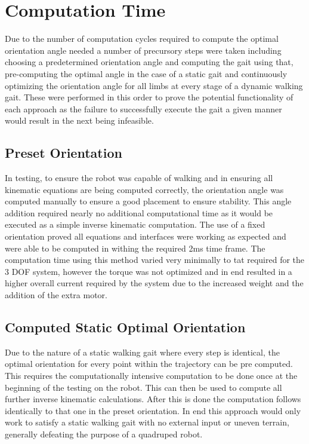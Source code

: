 \documentclass[12pt]{report}
\begin{document}
\section{Computation Time}\label{sec:CompTime}
Due to the number of computation cycles required to compute the optimal orientation angle needed a number of precursory steps were taken including choosing a predetermined orientation angle and computing the gait using that, pre-computing the optimal angle in the case of a static gait and continuously optimizing the orientation angle for all limbs at every stage of a dynamic walking gait. These were performed in this order to prove the potential functionality of each approach as the failure to successfully execute the gait a given manner would result in the next being infeasible.

\subsection{Preset Orientation}

In testing, to ensure the robot was capable of walking and in ensuring all kinematic equations are being computed correctly, the orientation angle was computed manually to ensure a good placement to ensure stability. This angle addition required nearly no additional computational time as it would be executed as a simple inverse kinematic computation. The use of a fixed orientation proved all equations and interfaces were working as expected and were able to be computed in withing the required 2ms time frame. The computation time using this method varied very minimally to tat required for the 3 DOF system, however the torque was not optimized and in end resulted in a higher overall current required by the system due to the increased weight and the addition of the extra motor.

\subsection{Computed Static Optimal Orientation}
Due to the nature of a static walking gait where every step is identical, the optimal orientation for every point within the trajectory can be pre computed. This requires the computationally intensive computation to be done once at the beginning of the testing on the robot. This can then be used to compute all further inverse kinematic calculations. After this is done the computation follows identically to that one in the preset orientation. In end this approach would only work to satisfy a static walking gait with no external input or uneven terrain, generally defeating the purpose of a quadruped robot.  
\end{document}
